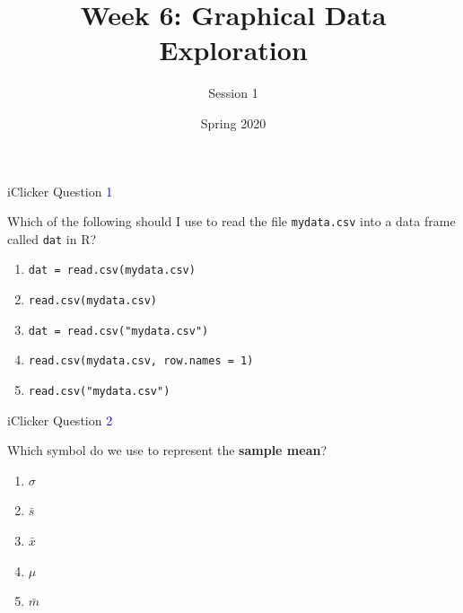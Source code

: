 \documentclass[ignorenonframetext,t]{beamer}
\title{Week 6: Graphical Data Exploration}
\subtitle{Session 1}
\date{Spring 2020}
\begin{document}
\frame{\titlepage}

\begin{frame}[fragile]{iClicker Question \textcolor{blue}{1}}

Which of the following should I use to read the file \texttt{mydata.csv}
into a data frame called \texttt{dat} in R?

\begin{enumerate}[A]
\item \texttt{dat = read.csv(mydata.csv)}
\item \texttt{read.csv(mydata.csv)}
\item \texttt{dat = read.csv("mydata.csv")}
\item \texttt{read.csv(mydata.csv, row.names = 1)}
\item \texttt{read.csv("mydata.csv")}
\end{enumerate}

\vfill


\end{frame}

\begin{frame}{iClicker Question \textcolor{blue}{2}}

Which symbol do we use to represent the \textbf{sample mean}?

\begin{enumerate}[A]
\item $\sigma$
\item $\bar s$
\item $\bar{x}$
\item $\mu$
\item $\bar{m}$
\end{enumerate}

\vfill


\end{frame}
\end{document}
